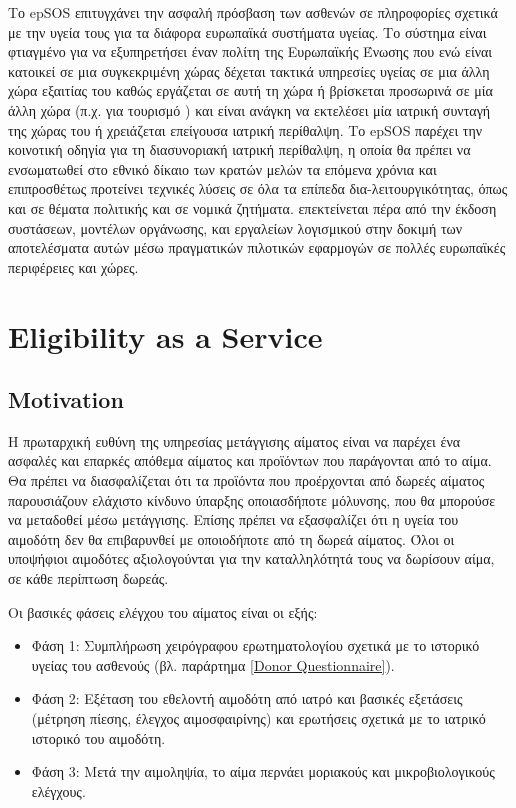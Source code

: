 		 Το epSOS επιτυγχάνει την ασφαλή πρόσβαση των ασθενών σε πληροφορίες σχετικά με την υγεία τους για τα διάφορα ευρωπαϊκά συστήματα υγείας. Το σύστημα είναι φτιαγμένο για να εξυπηρετήσει έναν πολίτη της Ευρωπαϊκής Ένωσης  που ενώ είναι κατοικεί σε μια συγκεκριμένη χώρας δέχεται τακτικά υπηρεσίες υγείας σε μια άλλη χώρα εξαιτίας του καθώς εργάζεται σε αυτή τη χώρα ή βρίσκεται προσωρινά σε μία άλλη χώρα (π.χ. για τουρισμό ) και είναι ανάγκη να εκτελέσει μία ιατρική συνταγή της χώρας του ή χρειάζεται επείγουσα ιατρική περίθαλψη. Το epSOS παρέχει την κοινοτική οδηγία για τη διασυνοριακή ιατρική περίθαλψη, η οποία θα πρέπει να ενσωματωθεί στο εθνικό δίκαιο των κρατών μελών τα επόμενα χρόνια και επιπροσθέτως προτείνει τεχνικές λύσεις σε όλα τα επίπεδα δια-λειτουργικότητας, όπως και σε θέματα πολιτικής και σε νομικά ζητήματα. επεκτείνεται πέρα από την έκδοση συστάσεων, μοντέλων οργάνωσης, και εργαλείων λογισμικού  στην  δοκιμή των αποτελέσματα αυτών μέσω πραγματικών πιλοτικών εφαρμογών σε πολλές ευρωπαϊκές περιφέρειες και χώρες.
		 


\section{Eligibility as a Service}

			\subsection{Motivation}
			
						
			Η πρωταρχική ευθύνη της υπηρεσίας μετάγγισης αίματος είναι να παρέχει ένα ασφαλές και επαρκές απόθεμα αίματος και προϊόντων που παράγονται από το αίμα. Θα πρέπει να διασφαλίζεται ότι τα προϊόντα που προέρχονται από δωρεές αίματος παρουσιάζουν ελάχιστο κίνδυνο ύπαρξης οποιασδήποτε μόλυνσης, που θα μπορούσε να μεταδοθεί μέσω μετάγγισης. Επίσης πρέπει να εξασφαλίζει ότι η υγεία του αιμοδότη δεν θα επιβαρυνθεί με οποιοδήποτε από τη δωρεά αίματος. Όλοι οι υποψήφιοι αιμοδότες αξιολογούνται για την καταλληλότητά τους να δωρίσουν αίμα, σε κάθε περίπτωση δωρεάς. 
		
		Οι βασικές φάσεις ελέγχου του αίματος είναι οι εξής:
		\begin{itemize}
		\item Φάση 1: Συμπλήρωση χειρόγραφου ερωτηματολογίου σχετικά με το ιστορικό υγείας του ασθενούς (βλ. παράρτημα \ref{Donor Questionnaire}).
		\item Φάση 2: Εξέταση του εθελοντή αιμοδότη από ιατρό και βασικές εξετάσεις (μέτρηση πίεσης, έλεγχος αιμοσφαιρίνης) και ερωτήσεις σχετικά με το ιατρικό ιστορικό του αιμοδότη.
		\item Φάση 3: Μετά την αιμοληψία, το αίμα περνάει μοριακούς και μικροβιολογικούς ελέγχους.
		\end{itemize}		 
		

